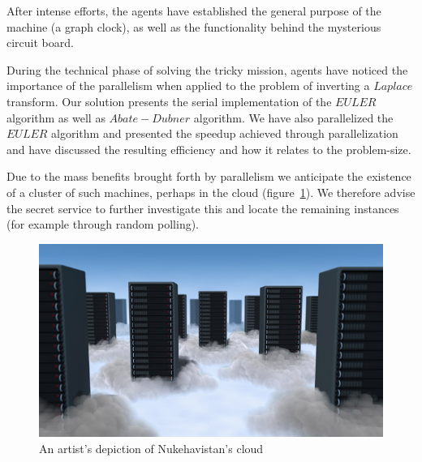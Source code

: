 After intense efforts, the agents have established the general purpose of the machine (a graph clock), as well as the functionality behind the mysterious circuit board. 

During the technical phase of solving the tricky mission, agents have noticed the importance of the parallelism when applied to the problem of inverting a $Laplace$ transform.
Our solution presents the serial implementation of the $EULER$ algorithm as well as $Abate-Dubner$ algorithm. We have also parallelized the $EULER$ algorithm
and presented the speedup achieved through parallelization and have discussed the resulting efficiency and how it relates to the problem-size.

Due to the mass benefits brought forth by parallelism we anticipate the existence of a cluster of such machines, perhaps in the cloud (figure~\ref{fig:cloud}). 
We therefore advise the secret service to further investigate this and locate the remaining instances (for example through random polling).

\begin{figure}[ht]
\centering
\includegraphics[scale=0.30]{img/cloud.jpg}
\caption{An artist's depiction of Nukehavistan's cloud  \protect \footnotemark}
\label{fig:cloud}

\end{figure}


  

